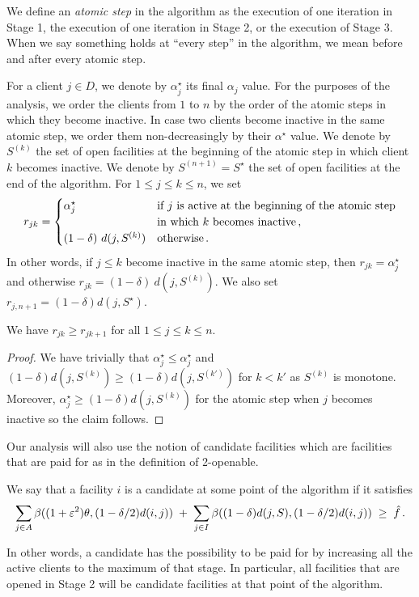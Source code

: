 We define an \emph{atomic step} in the algorithm as the execution of one iteration in Stage 1, the execution of one iteration in Stage 2, or the execution of Stage 3.
When we say something holds at ``every step'' in the algorithm, we mean before and after every atomic step.

For a client $j \in D$, we denote by $\alpha_j^\star$ its final $\alpha_j$ value.
For the purposes of the analysis, we order the clients from $1$ to $n$ by the order of the atomic steps in which they become inactive. 
In case two clients become inactive in the same atomic step, we order them non-decreasingly by their $\alpha^\star$ value.
We denote by $S^{(k)}$ the set of open facilities at the beginning of the atomic step in which client $k$ becomes inactive.
We denote by $S^{(n+1)} = S^\star$ the set of open facilities at the end of the algorithm.
For $1 \le j \leq k \le n$, we set 
\[
    r_{jk} = 
    \begin{cases}
        \alpha_j^\star &
        \begin{array}[t]{@{}l@{}}
            \text{if $j$ is active at the beginning of the atomic step}\\
            \text{in which $k$ becomes inactive}\,,
        \end{array}
        \\[2mm]
       (1-\delta)~d(j, S^{(k)}) & \text{otherwise}\,.
    \end{cases}
\]
In other words, if $j \le k$ become inactive in the same atomic step, then $ r_{jk} = \alpha^\star_j$ and otherwise $ r_{jk} =  (1-\delta)~d(j, S^{(k)})$.
We also set $r_{j,n+1} = (1-\delta)d(j, S^\star)$. 

\begin{observation}
\label{obs:r-noninc}
We have $r_{jk} \geq r_{jk+1}$ for all $1 \leq j \leq k \leq n$.
\end{observation}
\begin{proof}
    We have trivially that $\alpha_j^\star \leq \alpha_j^\star$ and $(1-\delta) d(j, S^{(k)}) \geq (1-\delta) d(j, S^{(k')})$ for $k < k'$ as $S^{(k)}$ is monotone.
    Moreover, $\alpha_j^\star \geq (1-\delta)d(j, S^{(k)})$ for the atomic step when $j$ becomes inactive so the claim follows.
\end{proof}

Our analysis will also use the notion of candidate facilities which are facilities that are paid for as in the definition of 2-openable. 
\begin{definition}
We say that a facility $i$ is a candidate at some point of the algorithm if it satisfies
\begin{align*}
    \sum_{j\in A}\beta((1+\varepsilon^2) \theta, (1- \delta/2)d(i,j))
    \;+\;
    \sum_{j\in I}\beta((1-\delta)d(j,S), (1-\delta/2)d(i,j))
    \;\ge\; \hat f\,.
\end{align*}
\end{definition}
In other words, a candidate has the possibility to be paid for by increasing all the active clients to the maximum of that stage. In particular, all facilities that are opened in Stage 2 will be candidate facilities at that point of the algorithm. 

